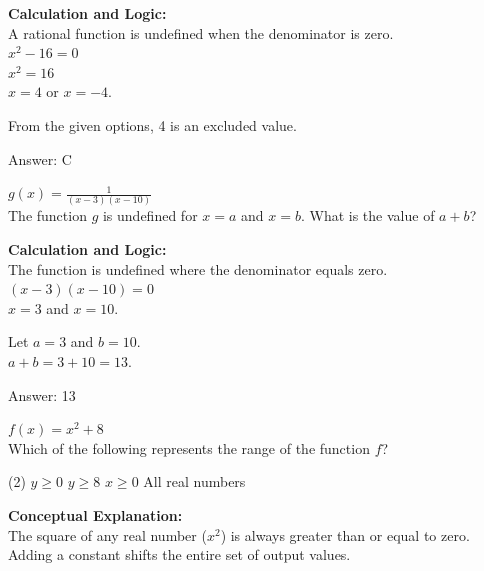 \documentclass[11pt,paper=a4,answers]{exam}
\begin{document}
\begin{questions}
\begin{solution}
\textbf{Calculation and Logic:} \\
A rational function is undefined when the denominator is zero. \\
$x^2 - 16 = 0$ \\
$x^2 = 16$ \\
$x = 4$ or $x = -4$.

\vspace{15pt}

From the given options, 4 is an excluded value.

\vspace{30pt}

Answer: \colorbox{yellow!100}{C}
\end{solution}

\vspace{40pt}

\question
$g(x) = \frac{1}{(x-3)(x-10)}$ \\
The function $g$ is undefined for $x = a$ and $x = b$. What is the value of $a + b$?

\begin{solution}
\textbf{Calculation and Logic:} \\
The function is undefined where the denominator equals zero. \\
$(x - 3)(x - 10) = 0$ \\
$x = 3$ and $x = 10$.

\vspace{15pt}

Let $a = 3$ and $b = 10$. \\
$a + b = 3 + 10 = 13$.

\vspace{30pt}

Answer: \colorbox{yellow!100}{13}
\end{solution}

\vspace{40pt}

\question
$f(x) = x^2 + 8$ \\
Which of the following represents the range of the function $f$?
\begin{tasks}(2)
    \task $y \geq 0$
    \task $y \geq 8$
    \task $x \geq 0$
    \task All real numbers
\end{tasks}

\begin{solution}
\textbf{Conceptual Explanation:} \\
The square of any real number ($x^2$) is always greater than or equal to zero. Adding a constant shifts the entire set of output values.


\end{solution}
\end{questions}
\end{document}
